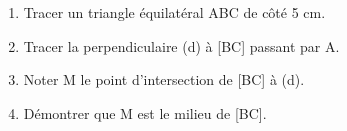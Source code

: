 \documentclass[exercice]{thedocument}%
\begin{document}
%
    \begin{enumerate}
        \item Tracer un triangle équilatéral ABC de côté 5 cm.
        \item Tracer la perpendiculaire (d) à [BC] passant par A.
        \item Noter M le point d'intersection de [BC] à (d).
        \item Démontrer que M est le milieu de [BC].
\end{enumerate}
\end{document}
